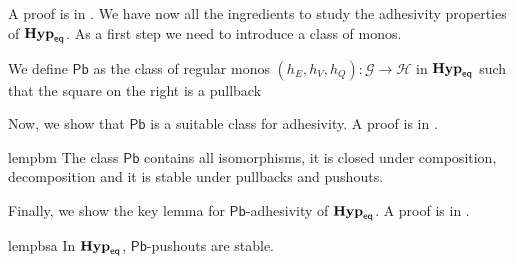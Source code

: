 \documentclass[3p]{elsarticle}
\newcommand{\pbc}{\mathsf{Pb}}
\newcommand{\catname}[1]{\textbf{\textup{#1}}}
\newcommand{\EqHyp}{\catname{Hyp}_{\mathsf{eq}}} %
\theoremstyle{remark}
\theoremstyle{definition}
\begin{document}
A proof is in .
We have now all the ingredients to study the adhesivity properties of $\EqHyp$.  As a first step we need to introduce a class of monos.

\noindent
\begin{minipage}[l]{.83\linewidth}
\begin{defi}
	We define $\pbc$ as the class of  regular monos $(h_E, h_V, h_Q)\colon \mathcal{G}\to \mathcal{H}$ in $\EqHyp$ such that the square on the right is a pullback
\end{defi}
\end{minipage} \hfill 
\begin{minipage}[r]{.15\linewidth}
 \end{minipage}

\vspace{.1cm}
Now, we show that $\pbc$ is a suitable class for adhesivity. A proof is in .

\begin{restatable}{lem}{pbm}\label{lem:pbmono}
	The class $\pbc$ contains all isomorphisms, it is closed under composition, decomposition and it is stable under pullbacks and pushouts.
\end{restatable}

\vspace{.1cm}
Finally, we show the key lemma for $\pbc$-adhesivity of $\EqHyp$. A proof is in .

\begin{restatable}{lem}{pbsa}\label{lemma:stab}
	In $\EqHyp$, $\pbc$-pushouts are stable.
\end{restatable}
\end{document}
